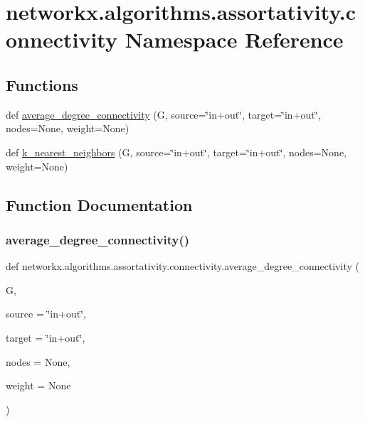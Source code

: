\hypertarget{namespacenetworkx_1_1algorithms_1_1assortativity_1_1connectivity}{}\section{networkx.\+algorithms.\+assortativity.\+connectivity Namespace Reference}
\label{namespacenetworkx_1_1algorithms_1_1assortativity_1_1connectivity}
\subsection*{Functions}
\begin{DoxyCompactItemize}
\item 
def \hyperlink{namespacenetworkx_1_1algorithms_1_1assortativity_1_1connectivity_a9cf3f457b301803e48ece3cdf10acde2}{average\+\_\+degree\+\_\+connectivity} (G, source=\char`\"{}in+out\char`\"{}, target=\char`\"{}in+out\char`\"{}, nodes=None, weight=None)
\item 
def \hyperlink{namespacenetworkx_1_1algorithms_1_1assortativity_1_1connectivity_a80631f000db4c5d03bd4c66601addd35}{k\+\_\+nearest\+\_\+neighbors} (G, source=\char`\"{}in+out\char`\"{}, target=\char`\"{}in+out\char`\"{}, nodes=None, weight=None)
\end{DoxyCompactItemize}


\subsection{Function Documentation}
\mbox{\label{namespacenetworkx_1_1algorithms_1_1assortativity_1_1connectivity_a9cf3f457b301803e48ece3cdf10acde2}} 
\subsubsection{\texorpdfstring{average\+\_\+degree\+\_\+connectivity()}{average\_degree\_connectivity()}}
{\footnotesize\ttfamily def networkx.\+algorithms.\+assortativity.\+connectivity.\+average\+\_\+degree\+\_\+connectivity (\begin{DoxyParamCaption}\item[{}]{G,  }\item[{}]{source = {\ttfamily \char`\"{}in+out\char`\"{}},  }\item[{}]{target = {\ttfamily \char`\"{}in+out\char`\"{}},  }\item[{}]{nodes = {\ttfamily None},  }\item[{}]{weight = {\ttfamily None} }\end{DoxyParamCaption})}

